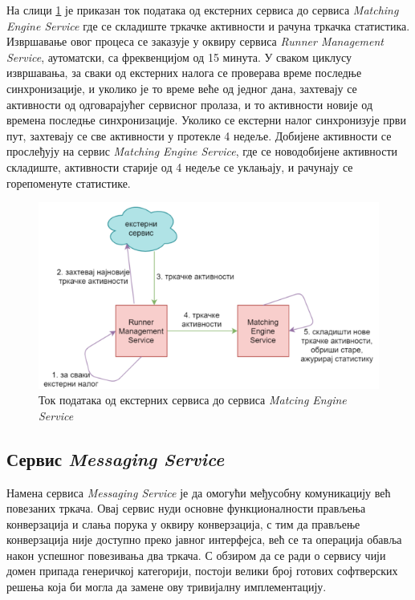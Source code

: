 \documentclass[12pt,oneside]{memoir}
\begin{document}
На слици \ref{fig:eksterni_servis_tok_podataka} је приказан ток података од екстерних сервиса до сервиса \textit{Matching Engine Service} где се складиште тркачке активности и рачуна тркачка статистика. Извршавање овог процеса се заказује у оквиру сервиса \textit{Runner Management Service}, аутоматски, са фреквенцијом од 15 минута. У сваком циклусу извршавања, за сваки од екстерних налога се проверава време последње синхронизације, и уколико је то време веће од једног дана, захтевају се активности од одговарајућег сервисног пролаза, и то активности новије од времена последње синхронизације. Уколико се екстерни налог синхронизује први пут, захтевају се све активности у протекле 4 недеље. Добијене активности се прослеђују на сервис \textit{Matching Engine Service}, где се новодобијене активности складиште, активности старије од 4 недеље се уклањају, и рачунају се горепоменуте статистике.

\begin{figure}[!ht]
  \centering
  \includegraphics[scale=0.7]{slike/eksterni-servis-tok-podataka.png}
  \caption{Ток података од екстерних сервиса до сервиса \textit{Matcing Engine Service}}
  \label{fig:eksterni_servis_tok_podataka}
\end{figure}

\subsection{Сервис \textit{Messaging Service}}
Намена сервиса \textit{Messaging Service} је да омогући међусобну комуникацију већ повезаних тркача. Овај сервис нуди основне функционалности прављења конверзација и слања порука у оквиру конверзација, с тим да прављење конверзација није доступно преко јавног интерфејса, већ се та операција обавља након успешног повезивања два тркача. С обзиром да се ради о сервису чији домен припада генеричкој категорији, постоји велики број готових софтверских решења која би могла да замене ову тривијалну имплементацију.
\end{document}
